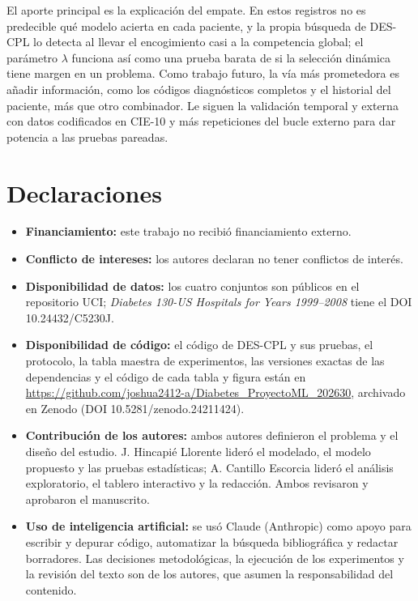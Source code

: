 \documentclass[pdflatex,sn-mathphys-num]{sn-jnl}
\theoremstyle{plain}
\begin{document}
El aporte principal es la explicación del empate. En estos registros no es predecible qué modelo acierta en cada paciente, y la propia búsqueda de DES-CPL lo detecta al llevar el encogimiento casi a la competencia global; el parámetro $\lambda$ funciona así como una prueba barata de si la selección dinámica tiene margen en un problema. Como trabajo futuro, la vía más prometedora es añadir información, como los códigos diagnósticos completos y el historial del paciente, más que otro combinador. Le siguen la validación temporal y externa con datos codificados en CIE-10 y más repeticiones del bucle externo para dar potencia a las pruebas pareadas.

\backmatter

\section*{Declaraciones}

\begin{itemize}
\item \textbf{Financiamiento:} este trabajo no recibió financiamiento externo.
\item \textbf{Conflicto de intereses:} los autores declaran no tener conflictos de interés.
\item \textbf{Disponibilidad de datos:} los cuatro conjuntos son públicos en el repositorio UCI; \emph{Diabetes 130-US Hospitals for Years 1999--2008} tiene el DOI 10.24432/C5230J.
\item \textbf{Disponibilidad de código:} el código de DES-CPL y sus pruebas, el protocolo, la tabla maestra de experimentos, las versiones exactas de las dependencias y el código de cada tabla y figura están en \url{https://github.com/joshua2412-a/Diabetes_ProyectoML_202630}, archivado en Zenodo (DOI 10.5281/zenodo.24211424).
\item \textbf{Contribución de los autores:} ambos autores definieron el problema y el diseño del estudio. J. Hincapié Llorente lideró el modelado, el modelo propuesto y las pruebas estadísticas; A. Cantillo Escorcia lideró el análisis exploratorio, el tablero interactivo y la redacción. Ambos revisaron y aprobaron el manuscrito.
\item \textbf{Uso de inteligencia artificial:} se usó Claude (Anthropic) como apoyo para escribir y depurar código, automatizar la búsqueda bibliográfica y redactar borradores. Las decisiones metodológicas, la ejecución de los experimentos y la revisión del texto son de los autores, que asumen la responsabilidad del contenido.
\end{itemize}
\end{document}
